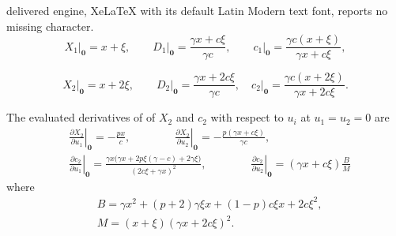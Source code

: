 \documentclass[10pt,a4paper]{amsart}
\begin{document}
delivered engine, XeLaTeX with its default Latin Modern text font, reports no missing character.
\begin{equation}
	\left. X_1 \right|_{\mathbf{0}} = x + \xi,  \qquad
	\left. D_1 \right|_{\mathbf{0}} = \frac{\gamma x + c \xi}{\gamma c}, \qquad \left. c_1 \right|_{\mathbf{0}} = \frac{\gamma c(x + \xi)}{\gamma x + c \xi}, \label{Eq:1_0}
\end{equation}

\begin{equation}
\left. X_2 \right|_{\mathbf{0}} = x + 2 \xi,\qquad \left. D_2 \right|_{\mathbf{0}} = \frac{\gamma x + 2 c \xi}{\gamma c}, \quad \left. c_2 \right|_{\mathbf{0}} = \frac{\gamma c(x + 2\xi)}{\gamma x + 2 c \xi}. 
\label{Eq:2_0}
\end{equation}

\begin{lemma}\label{Lemma:derivatives}
The evaluated derivatives of of $X_2$ and $c_2$ with respect to $u_i$ at $u_1 = u_2 =0$ are
\begin{align}
&\left.\frac{\partial X_2}{\partial u_1}\right|_{\mathbf{0}} = -\frac{px}{c}, \quad\quad\quad\quad \left.\frac{\partial X_2}{\partial u_2}\right|_{\mathbf{0}} =  -\frac{p(\gamma x+c\xi)}{\gamma c}, \label{Eq:eval_1}\\
&\left.\frac{\partial c_2}{\partial u_1}\right|_{\mathbf{0}}
= \frac{\gamma x\big(\gamma x + 2p\xi(\gamma-c) + 2\gamma\xi\big)}{(2c\xi+\gamma x)^2} , \quad\quad\quad\quad
\left.\frac{\partial c_2}{\partial u_2}\right|_{\mathbf{0}}
= (\gamma x + c\xi) \frac{B}{M}	 \label{Eq:eval_2}
\end{align}
where
\begin{align*}
&B = \gamma x^2 + (p+2)\gamma \xi x + (1-p)c\xi x + 2c\xi^2, \\
&M = (x+\xi) (\gamma x + 2 c\xi)^2.
\end{align*}
\end{lemma}
\end{document}
